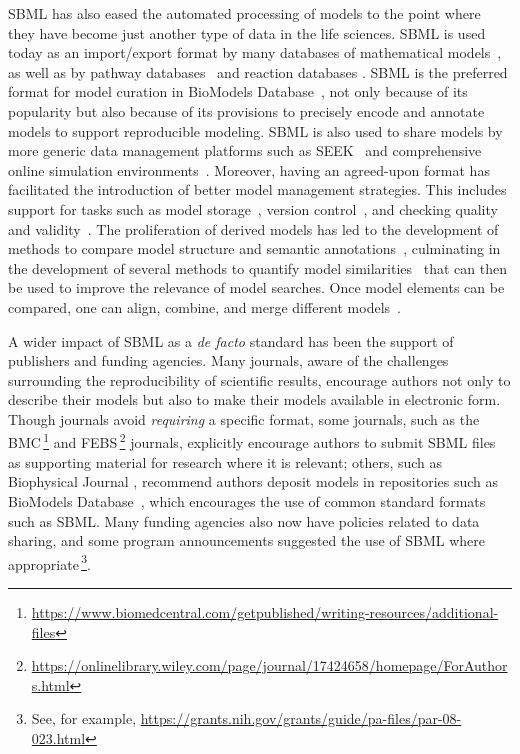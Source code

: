 \documentclass{sbml-paper}
\begin{document}
SBML has also eased the automated processing of models to the point where they have become just another type of data in the life sciences.  SBML is used today as an import/export format by many databases of mathematical models~\citep{Malik-Sheriff2020biomodels, Norsigian2019, Misirli2014composable}, as well as by pathway databases~\citep{caspi2015metacyc, mi_2016, fabregat2017reactome} and reaction databases \citep{ganter2013metanetx, wittig2017sabio}.  SBML is the preferred format for model curation in BioModels Database~\citep{Malik-Sheriff2020biomodels}, not only because of its popularity but also because of its provisions to precisely encode and annotate models to support reproducible modeling.  SBML is also used to share models by more generic data management platforms such as SEEK~\citep{wolstencroft2016fairdomhub} and comprehensive online simulation environments~\citep[e.g.,][]{Moraru2008virtual, peters2017jws, Weidemann2008sycamore, Lee2009webbased}.  Moreover, having an agreed-upon format has facilitated the introduction of better model management strategies.  This includes support for tasks such as model storage~\citep{Henkel2015combininga}, version control~\citep{Scharm2016algorithm}, and checking quality and validity~\citep{Liebermeister2008validity}.  The proliferation of derived models has led to the development of methods to compare model structure and semantic annotations~\citep{Lambusch2018identifying}, culminating in the development of several methods to quantify model similarities~\citep{henkel2016notions} that can then be used to improve the relevance of model searches.  Once model elements can be compared, one can align, combine, and merge different models~\citep{krause2010annotation}.
 
A wider impact of SBML as a \emph{de facto} standard has been the support of publishers and funding agencies.  Many journals, aware of the challenges surrounding the reproducibility of scientific results, encourage authors not only to describe their models but also to make their models available in electronic form.  Though journals avoid \emph{requiring} a specific format, some journals, such as the BMC$\,$\footnote{\url{https://www.biomedcentral.com/getpublished/writing-resources/additional-files}} and FEBS$\,$\footnote{\url{https://onlinelibrary.wiley.com/page/journal/17424658/homepage/ForAuthors.html}} journals, explicitly encourage authors to submit SBML files as supporting material for research where it is relevant; others, such as Biophysical Journal \citep{nickerson2017introducing}, recommend authors deposit models in repositories such as BioModels Database~\citep{Malik-Sheriff2020biomodels}, which encourages the use of common standard formats such as SBML.  Many funding agencies also now have policies related to data sharing, and some program announcements suggested the use of SBML where appropriate$\,$\footnote{See, for example, \url{https://grants.nih.gov/grants/guide/pa-files/par-08-023.html}}.
\end{document}
